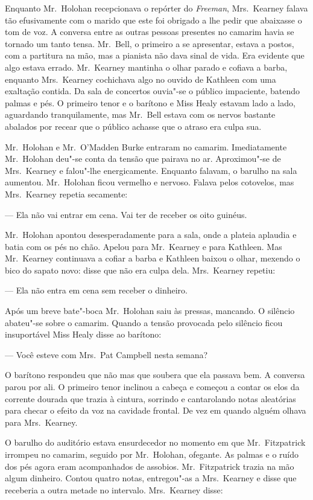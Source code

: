 Enquanto Mr.~Holohan recepcionava o repórter do \textit{Freeman}, Mrs.~Kearney
falava tão efusivamente com o marido que este foi obrigado a lhe pedir que
abaixasse o tom de voz.  A conversa entre as outras pessoas presentes no
camarim havia se tornado um tanto tensa.  Mr.~Bell, o primeiro a se
apresentar, estava a postos, com a partitura na mão, mas a pianista não dava
sinal de vida.  Era evidente que algo estava errado.  Mr.~Kearney mantinha o
olhar parado e cofiava a barba, enquanto Mrs.~Kearney cochichava algo no ouvido
de Kathleen com uma exaltação contida.  Da sala de concertos ouvia"-se o público
impaciente, batendo palmas e pés.  O primeiro tenor e o barítono e Miss Healy
estavam lado a lado, aguardando tranquilamente, mas Mr.~Bell estava com os
nervos bastante abalados por recear que o público achasse que o atraso era
culpa sua.

Mr.~Holohan e Mr.~O’Madden Burke entraram no camarim.  Imediatamente 
Mr.~Holohan deu"-se conta da tensão que pairava no ar.  Aproximou"-se de 
Mrs.~Kearney e falou"-lhe energicamente.  Enquanto falavam, o barulho na sala
aumentou.  Mr.~Holohan ficou vermelho e nervoso.  Falava pelos cotovelos, mas
Mrs.~Kearney repetia secamente:

--- Ela não vai entrar em cena.  Vai ter de receber os oito guinéus.

Mr.~Holohan apontou desesperadamente para a sala, onde a plateia aplaudia e
batia com os pés no chão.  Apelou para Mr.~Kearney e para Kathleen.  
Mas Mr.~Kearney continuava a cofiar a barba e Kathleen baixou o olhar, mexendo o bico
do sapato novo: disse que não era culpa dela.  Mrs.~Kearney repetiu:

--- Ela não entra em cena sem receber o dinheiro.

Após um breve bate"-boca Mr.~Holohan saiu às pressas, mancando.  O silêncio
abateu"-se sobre o camarim.  Quando a tensão provocada pelo silêncio ficou
insuportável Miss Healy disse ao barítono:

--- Você esteve com Mrs.~Pat Campbell nesta semana?

O barítono respondeu que não mas que soubera que ela passava bem.  A conversa
parou por ali.  O primeiro tenor inclinou a cabeça e começou a contar os elos
da corrente dourada que trazia à cintura, sorrindo e cantarolando notas
aleatórias para checar o efeito da voz na cavidade frontal.  De vez em quando
alguém olhava para Mrs.~Kearney.

O barulho do auditório estava ensurdecedor no momento em que Mr.~Fitzpatrick
irrompeu no camarim, seguido por Mr.~Holohan, ofegante.  As palmas e o ruído
dos pés agora eram acompanhados de assobios.  Mr.~Fitzpatrick trazia na mão
algum dinheiro.  Contou quatro notas, entregou"-as a Mrs.~Kearney e disse que
receberia a outra metade no intervalo.  Mrs.~Kearney disse:

